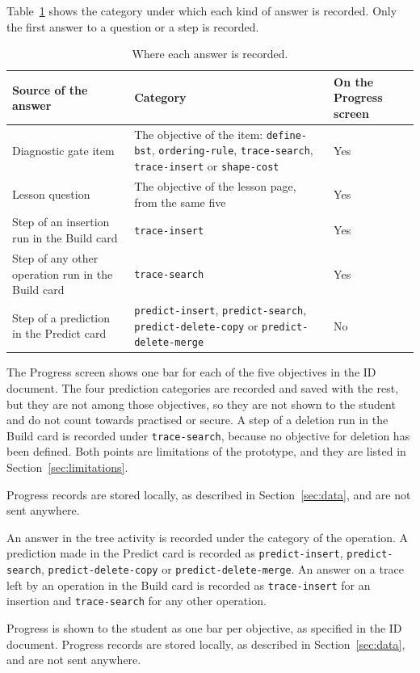 Table~\ref{tab:progress-categories} shows the category under which each kind of answer is recorded. Only the first answer to a question or a step is recorded.

\begin{table}[H]
\centering
\small
\caption{Where each answer is recorded.}
\label{tab:progress-categories}
\begin{tabularx}{\textwidth}{p{4.4cm} X p{2.6cm}}
\toprule
Source of the answer & Category & On the Progress screen \\
\midrule
Diagnostic gate item & The objective of the item: \texttt{define-bst}, \texttt{ordering-rule}, \texttt{trace-search}, \texttt{trace-insert} or \texttt{shape-cost} & Yes \\
Lesson question & The objective of the lesson page, from the same five & Yes \\
Step of an insertion run in the Build card & \texttt{trace-insert} & Yes \\
Step of any other operation run in the Build card & \texttt{trace-search} & Yes \\
Step of a prediction in the Predict card & \texttt{predict-insert}, \texttt{predict-search}, \texttt{predict-delete-copy} or \texttt{predict-delete-merge} & No \\
\bottomrule
\end{tabularx}
\end{table}

The Progress screen shows one bar for each of the five objectives in the ID document. The four prediction categories are recorded and saved with the rest, but they are not among those objectives, so they are not shown to the student and do not count towards practised or secure. A step of a deletion run in the Build card is recorded under \texttt{trace-search}, because no objective for deletion has been defined. Both points are limitations of the prototype, and they are listed in Section~\ref{sec:limitations}.

Progress records are stored locally, as described in Section~\ref{sec:data}, and are not sent anywhere.

An answer in the tree activity is recorded under the category of the operation. A prediction made in the Predict card is recorded as \texttt{predict-insert}, \texttt{predict-search}, \texttt{predict-delete-copy} or \texttt{predict-delete-merge}. An answer on a trace left by an operation in the Build card is recorded as \texttt{trace-insert} for an insertion and \texttt{trace-search} for any other operation.

Progress is shown to the student as one bar per objective, as specified in the ID document. Progress records are stored locally, as described in Section~\ref{sec:data}, and are not sent anywhere.